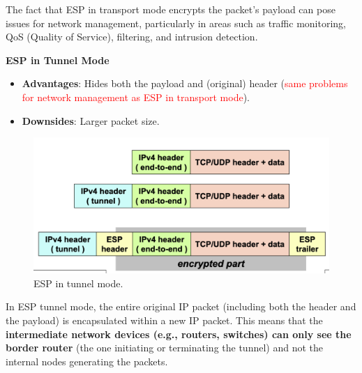 \begin{tcolorbox}[colback=red!10!white, colframe=red!70!black, coltitle=white, title=Bad News for Network Management]
    The fact that ESP in transport mode encrypts the packet's payload can pose issues for network management, particularly in areas such as traffic monitoring, QoS (Quality of Service), filtering, and intrusion detection.
\end{tcolorbox}



\begin{center}
    \textbf{ESP in Tunnel Mode}
\end{center}


\begin{multicols}{2}
    \raggedcolumns
    \begin{itemize}
        \item \textbf{Advantages}: Hides both the payload and (original) header (\textcolor{red}{same problems for network management as ESP in transport mode}).
        \item \textbf{Downsides}: Larger packet size.
    \end{itemize}

\columnbreak

\begin{figure}[H]
    \centering
    \includegraphics[width=\linewidth]{Images/NetSec/esp_tunnel_mode.png}
    \caption{ESP in tunnel mode.}
\end{figure}
\end{multicols}

\begin{tcolorbox}[colback=red!10!white, colframe=red!70!black, coltitle=white, title=Be aware]
    In ESP tunnel mode, the entire original IP packet (including both the header and the payload) is encapsulated within a new IP packet. This means that the \textbf{intermediate network devices (e.g., routers, switches) can only see the border router} (the one initiating or terminating the tunnel) and not the internal nodes generating the packets.
\end{tcolorbox}



